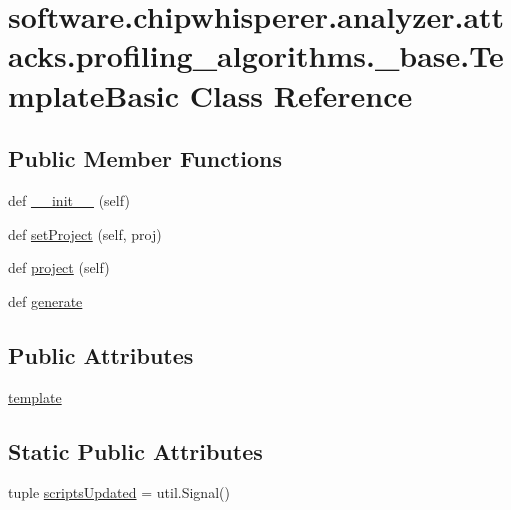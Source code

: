\hypertarget{classsoftware_1_1chipwhisperer_1_1analyzer_1_1attacks_1_1profiling__algorithms_1_1__base_1_1TemplateBasic}{}\section{software.\+chipwhisperer.\+analyzer.\+attacks.\+profiling\+\_\+algorithms.\+\_\+base.\+Template\+Basic Class Reference}
\label{classsoftware_1_1chipwhisperer_1_1analyzer_1_1attacks_1_1profiling__algorithms_1_1__base_1_1TemplateBasic}
\subsection*{Public Member Functions}
\begin{DoxyCompactItemize}
\item 
def \hyperlink{classsoftware_1_1chipwhisperer_1_1analyzer_1_1attacks_1_1profiling__algorithms_1_1__base_1_1TemplateBasic_af03ca70a3c3a34c685a21cb824efa7a2}{\+\_\+\+\_\+init\+\_\+\+\_\+} (self)
\item 
def \hyperlink{classsoftware_1_1chipwhisperer_1_1analyzer_1_1attacks_1_1profiling__algorithms_1_1__base_1_1TemplateBasic_afd973cdbe85f55323144c0dc8f77faf8}{set\+Project} (self, proj)
\item 
def \hyperlink{classsoftware_1_1chipwhisperer_1_1analyzer_1_1attacks_1_1profiling__algorithms_1_1__base_1_1TemplateBasic_add1f0e8326cace940d7515e4ca251932}{project} (self)
\item 
def \hyperlink{classsoftware_1_1chipwhisperer_1_1analyzer_1_1attacks_1_1profiling__algorithms_1_1__base_1_1TemplateBasic_a4ee453aadecc53aafc26babccd45bfc9}{generate}
\end{DoxyCompactItemize}
\subsection*{Public Attributes}
\begin{DoxyCompactItemize}
\item 
\hyperlink{classsoftware_1_1chipwhisperer_1_1analyzer_1_1attacks_1_1profiling__algorithms_1_1__base_1_1TemplateBasic_a098b59f986c379acd1b897e27c60a5a8}{template}
\end{DoxyCompactItemize}
\subsection*{Static Public Attributes}
\begin{DoxyCompactItemize}
\item 
tuple \hyperlink{classsoftware_1_1chipwhisperer_1_1analyzer_1_1attacks_1_1profiling__algorithms_1_1__base_1_1TemplateBasic_a080d84e752c0ee0bd48793ab91806888}{scripts\+Updated} = util.\+Signal()
\end{DoxyCompactItemize}


